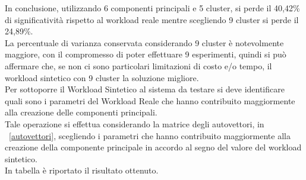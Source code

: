 In conclusione, utilizzando 6 componenti principali e 5 cluster, si perde il 40,42\%
di significatività rispetto al workload reale mentre scegliendo 9 cluster si perde il 24,89\%.\\
La percentuale di varianza conservata considerando 9 cluster è notevolmente maggiore,
con il compromesso di poter effettuare 9 esperimenti, quindi si può affermare che,
se non ci sono particolari limitazioni di costo e/o tempo, il workload sintetico con
9 cluster la soluzione migliore.\\
Per sottoporre il Workload Sintetico al sistema da testare si deve identificare
quali sono i parametri del Workload Reale che hanno contribuito maggiormente alla creazione
delle componenti principali.\\
Tale operazione si effettua considerando la matrice degli autovettori,
in \figurename~\ref{autovettori}, scegliendo i parametri
che hanno contribuito maggiormente alla creazione della componente principale in accordo
al segno del valore del workload sintetico. \\
In tabella è riportato il risultato ottenuto.
